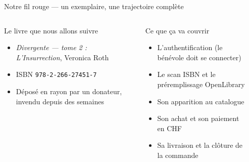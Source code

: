 \documentclass[aspectratio=169,10pt]{beamer}
\begin{document}
\begin{frame}{Notre fil rouge --- un exemplaire, une trajectoire complète}
  \begin{columns}[T]
    \begin{exampleblock}{Le livre que nous allons suivre}
      \begin{itemize}\small
        \item \textit{Divergente --- tome 2 : L'Insurrection}, Veronica Roth
        \item ISBN \texttt{978-2-266-27451-7}
        \item Déposé en rayon par un donateur, invendu depuis des semaines
      \end{itemize}
    \end{exampleblock}
    \vspace{6pt}
    \begin{block}{Ce que ça va couvrir}
      \begin{itemize}\small
        \item L'authentification (le bénévole doit se connecter)
        \item Le scan ISBN et le préremplissage OpenLibrary
        \item Son apparition au catalogue
        \item Son achat et son paiement en CHF
        \item Sa livraison et la clôture de la commande
      \end{itemize}
    \end{block}
    \begin{center}
    \end{center}
    \vspace{4pt}
  \end{columns}
\end{frame}
\end{document}
